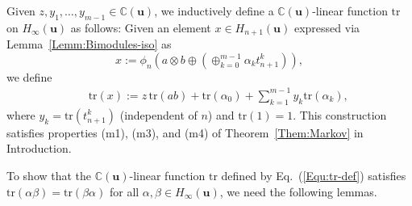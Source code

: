 \documentclass[a4paper, oneside]{amsart}
\numberwithin{equation}{section}
\theoremstyle{definition}
\theoremstyle{remark}
\begin{document}
Given $z, y_1, \ldots, y_{m-1}\in \mathbb{C}(\boldsymbol{u})$,
we inductively define a $\mathbb{C}(\boldsymbol{u})$-linear function $\mathrm{tr}$ on $H_{\infty}(\boldsymbol{u})$ as follows:
Given an element $x\in H_{n+1}(\boldsymbol{u})$ expressed via Lemma~\ref{Lemm:Bimodules-iso} as
\begin{equation*}
  x:=\phi_n\left(a\otimes b\oplus\left(\oplus_{k=0}^{m-1}\alpha_kt_{n+1}^k\right)\right),
\end{equation*}
 we define
\begin{eqnarray}\label{Equ:tr-def}
&& \mathrm{tr}(x):=z\mathrm{\,tr}(ab)+\mathrm{tr}(\alpha_0)+\sum_{k=1}^{m-1}
y_k\mathrm{tr}(\alpha_k),
\end{eqnarray}
where $y_k=\mathrm{tr}(t_{n+1}^k)$ (independent of $n$) and $\mathrm{tr}(1)=1$. This construction satisfies properties (m1), (m3), and (m4) of Theorem~\ref{Them:Markov} in Introduction.


To show that the $\mathbb{C}(\boldsymbol{u})$-linear function $\mathrm{tr}$ defined by Eq.~(\ref{Equ:tr-def}) satisfies  $\mathrm{tr}(\alpha\beta)=\mathrm{tr}(\beta\alpha)$ for all $\alpha,\beta\in H_{\infty}(\boldsymbol{u})$, we need the following lemmas.
\end{document}
